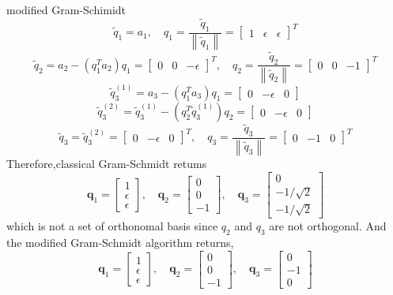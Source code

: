 \documentclass[english,onecolumn]{IEEEtran}
\begin{document}
\begin{enumerate}
modified Gram-Schimidt
$$
\tilde{q}_{1}=a_{1}, \quad q_{1}=\frac{\tilde{q}_{1}}{\left\|\tilde{q}_{1}\right\|}=\left[\begin{array}{lll}
	1 & \epsilon & \epsilon
\end{array}\right]^{T}
$$
$$
\tilde{q}_{2}=a_{2}-\left(q_{1}^{T} a_{2}\right) q_{1}=\left[\begin{array}{ccc}
	0 & 0 & -\epsilon
\end{array}\right]^{T}, \quad q_{2}=\frac{\tilde{q}_{2}}{\left\|\tilde{q}_{2}\right\|}=\left[\begin{array}{ccc}
	0 & 0 & -1
\end{array}\right]^{T}
$$
$$
\tilde{q}_{3}^{(1)}=a_{3}-\left(q_{1}^{T} a_{3}\right) q_{1}=\left[\begin{array}{ccc}
	0 & -\epsilon & 0
\end{array}\right]
$$
$$
\tilde{q}_{3}^{(2)}=\tilde{q}_{3}^{(1)}-\left(q_{2}^{T} \tilde{q}_{3}^{(1)}\right) q_{2}=\left[\begin{array}{ccc}
	0 & -\epsilon & 0
\end{array}\right]
$$
$$
\tilde{q}_{3}=\tilde{q}_{3}^{(2)}=\left[\begin{array}{ccc}
	0 & -\epsilon & 0
\end{array}\right]^{T}, \quad q_{3}=\frac{\tilde{q}_{3}}{\left\|\tilde{q}_{3}\right\|}=\left[\begin{array}{ccc}
	0 & -1 & 0
\end{array}\right]^{T}
$$
Therefore,classical Gram-Schmidt retums
$$
\mathbf{q}_{1}=\left[\begin{array}{l}
	1 \\
	\epsilon \\
	\epsilon
\end{array}\right], \quad \mathbf{q}_{2}=\left[\begin{array}{c}
	0 \\
	0 \\
	-1
\end{array}\right], \quad \mathbf{q}_{3}=\left[\begin{array}{c}
	0 \\
	-1 / \sqrt{2} \\
	-1 / \sqrt{2}
\end{array}\right]
$$
which is not a set of orthonomal basis since $q_{2}$ and $q_{3}$ are not orthogonal. And the modified Gram-Schmidt
algorithm returns,
$$
\mathbf{q}_{1}=\left[\begin{array}{l}
	1 \\
	\epsilon \\
	\epsilon
\end{array}\right], \quad \mathbf{q}_{2}=\left[\begin{array}{c}
	0 \\
	0 \\
	-1
\end{array}\right], \quad \mathbf{q}_{3}=\left[\begin{array}{c}
	0 \\
	-1 \\
	0
\end{array}\right]
$$


\end{enumerate}
\end{document}
